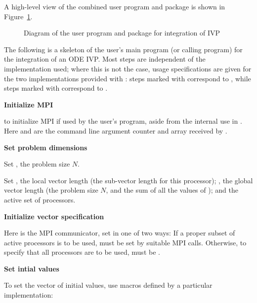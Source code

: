 A high-level view of the combined user program and {\cvodes} package is
shown in Figure~\ref{f:sim_overview}.
\begin{figure}
\centerline{}
\caption {Diagram of the user program and 
  {\cvodes} package for integration of IVP}\label{f:sim_overview}
\end{figure}
The following is a skeleton of the user's main program (or calling
program) for the integration of an ODE IVP. Most steps are independent of the {\nvector}
implementation used; where this is not the case, usage specifications are given for the
two implementations provided with {\cvodes}: steps marked with {\p} correspond to 
{\nvecp}, while steps marked with {\s} correspond to {\nvecs}.
%
\begin{Steps}
  
\item 
  {\bf Initialize MPI}

  {\p}  to initialize MPI if used by
  the user's program, aside from the internal use in {\nvecp}.  
  Here  and  are the command line argument 
  counter and array received by .
  
\item
  {\bf Set problem dimensions}

  {\s} Set , the problem size $N$.

  {\p} Set , the local vector length (the sub-vector
  length for this processor); , the global vector length (the
  problem size $N$, and the sum of all the values of );
  and the active set of processors.
  
\item
  {\bf Initialize vector specification}

  {\s} 

  {\p} 
  Here  is the MPI communicator, set in one of two ways: 
  If a proper subset of active processors is to be used,  
  must be set by suitable MPI calls. Otherwise, to specify that all 
  processors are to be used,  must be .
  
\item
  {\bf Set intial values}
 
  To set the vector  of initial values, use macros defined by a particular 
  {\nvector} implementation:


\end{Steps}
